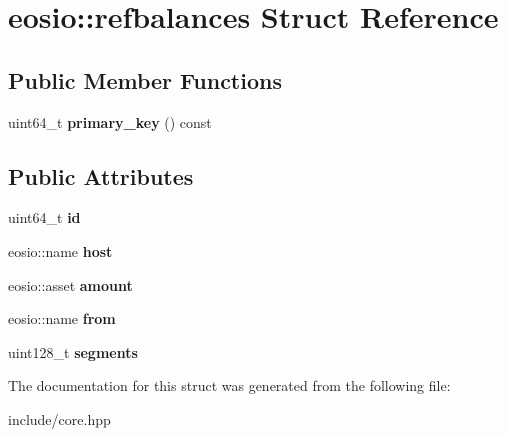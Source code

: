 \hypertarget{structeosio_1_1refbalances}{}\section{eosio\+:\+:refbalances Struct Reference}
\label{structeosio_1_1refbalances}
\subsection*{Public Member Functions}
\begin{DoxyCompactItemize}
\item 
\mbox{\label{structeosio_1_1refbalances_abe2ec5b1cb3699f66a4697a7320ba989}} 
uint64\+\_\+t {\bfseries primary\+\_\+key} () const
\end{DoxyCompactItemize}
\subsection*{Public Attributes}
\begin{DoxyCompactItemize}
\item 
\mbox{\label{structeosio_1_1refbalances_a88f024b828b2bbdc1de415acf4fe51ee}} 
uint64\+\_\+t {\bfseries id}
\item 
\mbox{\label{structeosio_1_1refbalances_a30c753342929bb15cb221516bb8b7f51}} 
eosio\+::name {\bfseries host}
\item 
\mbox{\label{structeosio_1_1refbalances_abe419a7f91c10e7594e8af6d6cbf3282}} 
eosio\+::asset {\bfseries amount}
\item 
\mbox{\label{structeosio_1_1refbalances_a987729685eb6421e2742d6f9764e3ac5}} 
eosio\+::name {\bfseries from}
\item 
\mbox{\label{structeosio_1_1refbalances_ac58af2c0cfc38e382e595f5dfaa41248}} 
uint128\+\_\+t {\bfseries segments}
\end{DoxyCompactItemize}


The documentation for this struct was generated from the following file\+:\begin{DoxyCompactItemize}
\item 
include/core.\+hpp\end{DoxyCompactItemize}
